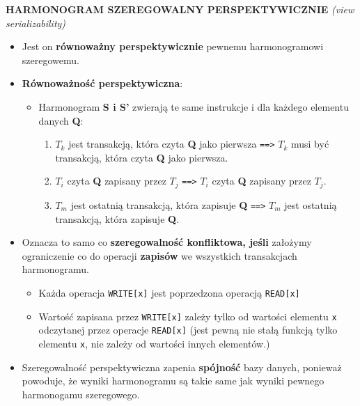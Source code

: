 \documentclass[a5paper,6pt]{article}
\begin{document}
    \textbf{HARMONOGRAM SZEREGOWALNY PERSPEKTYWICZNIE}
    \textit{(view serializability)}
    \begin{itemize}
        \item Jest on \textbf{równoważny perspektywicznie} pewnemu
        harmonogramowi szeregowemu.
        \item \textbf{Równoważność perspektywiczna}:
        \begin{itemize}
            \item Harmonogram \textbf{S i S'} zwierają te same instrukcje i dla
                  każdego elementu danych \textbf{Q}:
            \begin{enumerate}
                \item $T_k$ jest transakcją, która czyta \textbf{Q} jako
                      pierwsza \texttt{==>} $T_k$ musi być transakcją, która
                      czyta \textbf{Q} jako pierwsza.
                \item $T_i$ czyta \textbf{Q} zapisany przez $T_j$ \texttt{==>}
                      $T_i$ czyta \textbf{Q} zapisany przez $T_j$.
                \item $T_m$ jest ostatnią transakcją, która zapisuje \textbf{Q}
                      \texttt{==>} $T_m$ jest ostatnią transakcją, która
                      zapisuje \textbf{Q}.
            \end{enumerate}
        \end{itemize}
        \item Oznacza to samo co \textbf{szeregowalność konfliktowa, jeśli}
              założymy ograniczenie co do operacji \textbf{zapisów} we
              wszystkich transakcjach harmonogramu.
        \begin{itemize}
            \item Każda operacja \texttt{WRITE[x]} jest poprzedzona operacją
                  \texttt{READ[x]}
            \item Wartość zapisana przez \texttt{WRITE[x]} zależy tylko od
                  wartości elementu \texttt{x} odczytanej przez operacje
                  \texttt{READ[x]} (jest pewną nie stałą funkcją tylko elementu
                  \texttt{x}, nie zależy od wartości innych elementów.)
        \end{itemize}

        \item Szeregowalność perspektywiczna zapenia \textbf{spójność} bazy
              danych, ponieważ powoduje, że wyniki harmonogramu są takie same
              jak wyniki pewnego harmonogamu szeregowego.
    \end{itemize}
\end{document}
